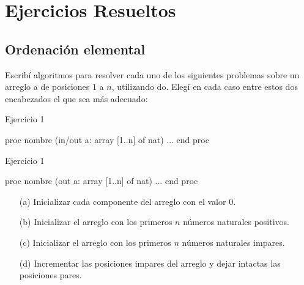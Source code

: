 \chapter{Ejercicios Resueltos}

\section{Ordenación elemental}
Escribí algoritmos para resolver cada uno de los siguientes problemas sobre un arreglo a de posiciones $1$ a $n$, utilizando do. Elegí en cada caso entre estos dos encabezados el que sea más adecuado:

\begin{codebox}{Ejercicio 1}
\begin{pascallike}
proc nombre (in/out a: array [1..n] of nat)
    ...
end proc
\end{pascallike}
\end{codebox}
\begin{codebox}{Ejercicio 1}
\begin{pascallike}
proc nombre (out a: array [1..n] of nat)
    ...
end proc
\end{pascallike}
\end{codebox}
\begin{itemize}
    \item[(a)] Inicializar cada componente del arreglo con el valor $0$.
    \item[(b)] Inicializar el arreglo con los primeros $n$ números naturales positivos.
    \item[(c)] Inicializar el arreglo con los primeros $n$ números naturales impares.
    \item[(d)] Incrementar las posiciones impares del arreglo y dejar intactas las posiciones pares.  
\end{itemize}


